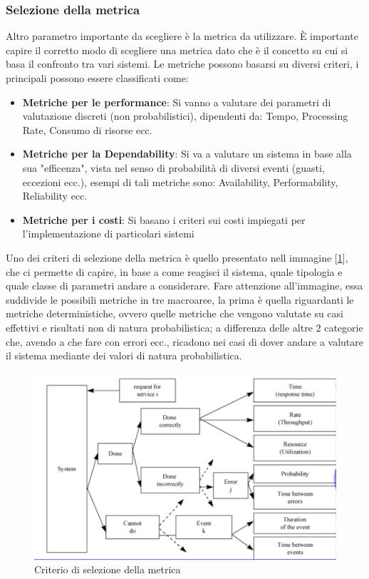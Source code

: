 \subsubsection{Selezione della metrica}
Altro parametro importante da scegliere è la metrica da utilizzare. \uppercase{è} importante capire il corretto modo di scegliere una metrica dato che è il concetto su cui si basa il confronto tra vari sistemi. Le metriche possono basarsi su diversi criteri, i principali possono essere classificati come:
\begin{itemize}
    \item \textbf{Metriche per le performance}: Si vanno a valutare dei parametri di valutazione discreti (non probabilistici), dipendenti da: Tempo, Processing Rate, Consumo di risorse ecc.
    
    \item \textbf{Metriche per la Dependability}: Si va a valutare un sistema in base alla sua "efficenza", vista nel senso di probabilità di diversi eventi (guasti, eccezioni ecc.), esempi di tali metriche sono: Availability, Performability, Reliability ecc.
     
    \item \textbf{Metriche per i costi}: Si basano i criteri sui costi impiegati per l'implementazione di particolari sistemi
\end{itemize}

Uno dei criteri di selezione della metrica è quello presentato nell immagine [\ref{img:criterio-metrica}], che ci permette di capire, in base a come reagisci il sistema, quale tipologia e quale classe di parametri andare a considerare. Fare attenzione all'immagine, essa suddivide le possibili metriche in tre macroaree, la prima è quella riguardanti le metriche deterministiche, ovvero quelle metriche che vengono valutate su casi effettivi e risultati non di natura probabilistica; a differenza delle altre 2 categorie che, avendo a che fare con errori ecc., ricadono nei casi di dover andare a valutare il sistema mediante dei valori di natura probabilistica.

\begin{figure}
    \includegraphics[width=.8\textwidth]{img/chapter-1/Metrics.png}
    \centering
    \caption{Criterio di selezione della metrica}\label{img:criterio-metrica}
\end{figure}


